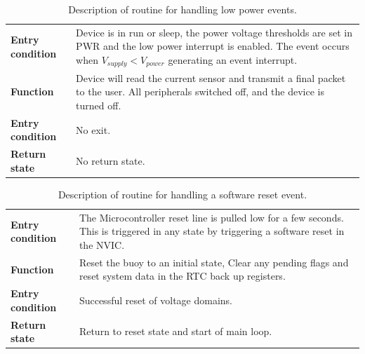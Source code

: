 \begin{table}[H]
	\centering
	\caption{Description of routine for handling low power events.}
	\setlength{\extrarowheight}{5pt}
	\begin{tabular}{|>{\raggedright\arraybackslash}m{}|>{\raggedright\arraybackslash}m{}|}
		\hline
		\multicolumn{2}{|l|}{\textbf{Low power detection}} \\
		\hline
		\textbf{Entry condition}  & Device is in run or sleep, the power voltage thresholds are set in PWR and the low power interrupt is enabled. The event occurs when $V_{supply} < V_{power}$ generating an event interrupt. \\
		\hline
		\textbf{Function} & Device will read the current sensor and transmit a final packet to the user. All peripherals switched off, and the device is turned off.\\
		\hline
		\textbf{Entry condition} & No exit.\\
		\hline
		\textbf{Return state} & No return state.\\
		\hline
	\end{tabular}
	
	\label{tab:Ev_desc_LPD}
\end{table}

\begin{table}[H]
	\centering
	\caption{Description of routine for handling a software reset event.}
	\setlength{\extrarowheight}{5pt}
	\begin{tabular}{|>{\raggedright\arraybackslash}m{}|>{\raggedright\arraybackslash}m{}|}
		\hline
		\multicolumn{2}{|l|}{\textbf{Software reset}} \\
		\hline
		\textbf{Entry condition}  & The Microcontroller reset line is pulled low for a few seconds. This is triggered in any state by triggering a software reset in the NVIC.\\
		\hline
		\textbf{Function} & Reset the buoy to an initial state, Clear any pending flags and reset system data in the RTC back up registers.\\
		\hline
		\textbf{Entry condition} & Successful reset of voltage domains.\\
		\hline
		\textbf{Return state} & Return to reset state and start of main loop.\\
		\hline
	\end{tabular}
	
	\label{tab:Ev_desc_SWR}
\end{table}


